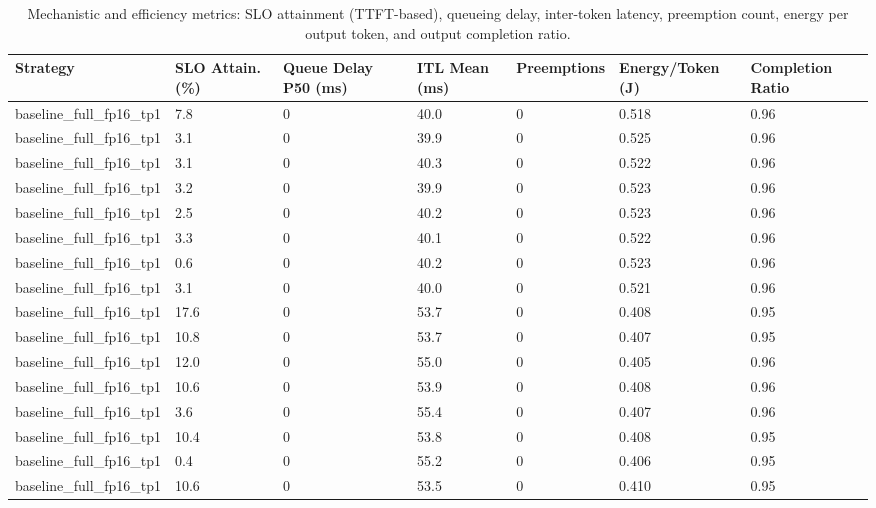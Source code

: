 \begin{table}
\caption{Mechanistic and efficiency metrics: SLO attainment (TTFT-based), queueing delay, inter-token latency, preemption count, energy per output token, and output completion ratio.}
\label{tab:efficiency}
\begin{tabular}{lllllll}
\toprule
Strategy & SLO Attain. (\%) & Queue Delay P50 (ms) & ITL Mean (ms) & Preemptions & Energy/Token (J) & Completion Ratio \\
\midrule
baseline\_full\_fp16\_tp1 & 7.8 & 0 & 40.0 & 0 & 0.518 & 0.96 \\
baseline\_full\_fp16\_tp1 & 3.1 & 0 & 39.9 & 0 & 0.525 & 0.96 \\
baseline\_full\_fp16\_tp1 & 3.1 & 0 & 40.3 & 0 & 0.522 & 0.96 \\
baseline\_full\_fp16\_tp1 & 3.2 & 0 & 39.9 & 0 & 0.523 & 0.96 \\
baseline\_full\_fp16\_tp1 & 2.5 & 0 & 40.2 & 0 & 0.523 & 0.96 \\
baseline\_full\_fp16\_tp1 & 3.3 & 0 & 40.1 & 0 & 0.522 & 0.96 \\
baseline\_full\_fp16\_tp1 & 0.6 & 0 & 40.2 & 0 & 0.523 & 0.96 \\
baseline\_full\_fp16\_tp1 & 3.1 & 0 & 40.0 & 0 & 0.521 & 0.96 \\
baseline\_full\_fp16\_tp1 & 17.6 & 0 & 53.7 & 0 & 0.408 & 0.95 \\
baseline\_full\_fp16\_tp1 & 10.8 & 0 & 53.7 & 0 & 0.407 & 0.95 \\
baseline\_full\_fp16\_tp1 & 12.0 & 0 & 55.0 & 0 & 0.405 & 0.96 \\
baseline\_full\_fp16\_tp1 & 10.6 & 0 & 53.9 & 0 & 0.408 & 0.96 \\
baseline\_full\_fp16\_tp1 & 3.6 & 0 & 55.4 & 0 & 0.407 & 0.96 \\
baseline\_full\_fp16\_tp1 & 10.4 & 0 & 53.8 & 0 & 0.408 & 0.95 \\
baseline\_full\_fp16\_tp1 & 0.4 & 0 & 55.2 & 0 & 0.406 & 0.95 \\
baseline\_full\_fp16\_tp1 & 10.6 & 0 & 53.5 & 0 & 0.410 & 0.95 \\
\bottomrule
\end{tabular}
\end{table}
